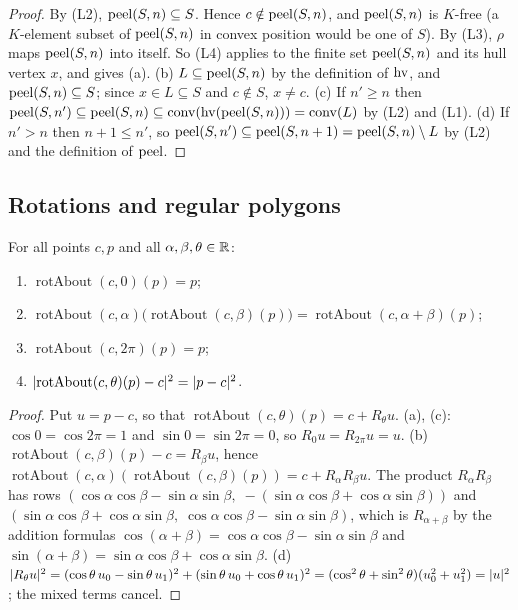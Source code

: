 \begin{proof}
By (L2), $\operatorname{peel}(S,n)\subseteq S$. Hence $c\notin\operatorname{peel}(S,n)$, and $\operatorname{peel}(S,n)$ is $K$-free (a $K$-element subset of
$\operatorname{peel}(S,n)$ in convex position would be one of $S$). By (L3), $\rho$ maps $\operatorname{peel}(S,n)$ into itself. So (L4) applies to
the finite set $\operatorname{peel}(S,n)$ and its hull vertex $x$, and gives (a).
(b) $L\subseteq\operatorname{peel}(S,n)$ by the definition of $\operatorname{hv}$, and $\operatorname{peel}(S,n)\subseteq S$; since $x\in L\subseteq S$ and
$c\notin S$, $x\ne c$.
(c) If $n'\ge n$ then $\operatorname{peel}(S,n')\subseteq\operatorname{peel}(S,n)\subseteq\operatorname{conv}(\operatorname{hv}(\operatorname{peel}(S,n)))=\operatorname{conv}(L)$ by (L2) and (L1).
(d) If $n'>n$ then $n+1\le n'$, so $\operatorname{peel}(S,n')\subseteq\operatorname{peel}(S,n+1)=\operatorname{peel}(S,n)\setminus L$ by (L2) and the definition
of $\operatorname{peel}$.
\end{proof}

\subsection{Rotations and regular polygons}\label{lg:ssec:rot}

\begin{lemma}\label{lg:lem:rotfacts}
For all points $c,p$ and all $\alpha,\beta,\theta\in\mathbb R$:
\begin{enumerate}[label=(\alph*)]
\item $\operatorname{rotAbout}(c,0)(p)=p$;
\item $\operatorname{rotAbout}(c,\alpha)\bigl(\operatorname{rotAbout}(c,\beta)(p)\bigr)=\operatorname{rotAbout}(c,\alpha+\beta)(p)$;
\item $\operatorname{rotAbout}(c,2\pi)(p)=p$;
\item $\lvert\operatorname{rotAbout}(c,\theta)(p)-c\rvert^2=\lvert p-c\rvert^2$.
\end{enumerate}
\end{lemma}

\begin{proof}
Put $u=p-c$, so that $\operatorname{rotAbout}(c,\theta)(p)=c+R_\theta u$.
(a), (c): $\cos0=\cos2\pi=1$ and $\sin0=\sin2\pi=0$, so $R_0u=R_{2\pi}u=u$.
(b) $\operatorname{rotAbout}(c,\beta)(p)-c=R_\beta u$, hence
$\operatorname{rotAbout}(c,\alpha)(\operatorname{rotAbout}(c,\beta)(p))=c+R_\alpha R_\beta u$. The product
$R_\alpha R_\beta$ has rows $(\cos\alpha\cos\beta-\sin\alpha\sin\beta,\;-(\sin\alpha\cos\beta+\cos\alpha\sin\beta))$ and
$(\sin\alpha\cos\beta+\cos\alpha\sin\beta,\;\cos\alpha\cos\beta-\sin\alpha\sin\beta)$, which is $R_{\alpha+\beta}$ by
the addition formulas $\cos(\alpha+\beta)=\cos\alpha\cos\beta-\sin\alpha\sin\beta$ and
$\sin(\alpha+\beta)=\sin\alpha\cos\beta+\cos\alpha\sin\beta$.
(d) $\lvert R_\theta u\rvert^2=(\cos\theta\,u_0-\sin\theta\,u_1)^2+(\sin\theta\,u_0+\cos\theta\,u_1)^2
=(\cos^2\theta+\sin^2\theta)(u_0^2+u_1^2)=\lvert u\rvert^2$; the mixed terms cancel.
\end{proof}


